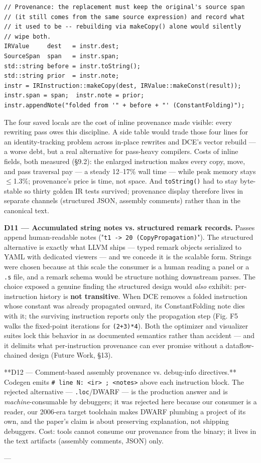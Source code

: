 \begin{verbatim}
// Provenance: the replacement must keep the original's source span
// (it still comes from the same source expression) and record what
// it used to be -- rebuilding via makeCopy() alone would silently
// wipe both.
IRValue     dest   = instr.dest;
SourceSpan  span   = instr.span;
std::string before = instr.toString();
std::string prior  = instr.note;
instr = IRInstruction::makeCopy(dest, IRValue::makeConst(result));
instr.span = span;  instr.note = prior;
instr.appendNote("folded from '" + before + "' (ConstantFolding)");
\end{verbatim}

The four saved locals are the cost of inline provenance made visible:
every rewriting pass owes this discipline. A side table would trade
those four lines for an identity-tracking problem across in-place
rewrites and DCE's vector rebuild --- a worse debt, but a real
alternative for pass-heavy compilers. Costs of inline fields, both
measured (\S9.2): the enlarged instruction makes every copy, move,
and pass traversal pay --- a steady 12--17\% wall time --- while peak
memory stays $\leq$1.3\%; provenance's price is time, not space. And
\texttt{toString()} had to stay byte-stable so thirty golden IR tests
survived; provenance display therefore lives in separate channels
(structured JSON, assembly comments) rather than in the canonical
text.

\textbf{D11 --- Accumulated string notes vs. structured remark records.}
Passes append human-readable notes ("\texttt{t1 -> 20 (CopyPropagation)}").
The structured alternative is exactly what LLVM ships --- typed remark
objects serialized to YAML with dedicated viewers \cite{llvm-remarks} --- and we
concede it is the scalable form. Strings were chosen because at this scale the consumer
is a human reading a panel or a \texttt{.s} file, and a remark schema would
be structure nothing downstream parses. The choice exposed a genuine
finding the structured design would \emph{also} exhibit: per-instruction
history is \textbf{not transitive}. When DCE removes a folded instruction
whose constant was already propagated onward, its ConstantFolding
note dies with it; the surviving instruction reports only the
propagation step (Fig. F5 walks the fixed-point iterations for
\texttt{(2+3)*4}). Both the optimizer and visualizer suites lock this
behavior in as documented semantics rather than accident --- and it
delimits what per-instruction provenance can ever promise without a
dataflow-chained design (Future Work, \S13).

**D12 --- Comment-based assembly provenance vs. debug-info
directives.** Codegen emits \texttt{\# line N: <ir> ; <notes>} above each
instruction block. The rejected alternative --- \texttt{.loc}/DWARF --- is the
production answer and is \emph{machine}-consumable by debuggers; it was
rejected here because our consumer is a reader, our 2006-era target
toolchain makes DWARF plumbing a project of its own, and the paper's
claim is about preserving explanation, not shipping debuggers. Cost:
tools cannot consume our provenance from the binary; it lives in the
text artifacts (assembly comments, JSON) only.

---


